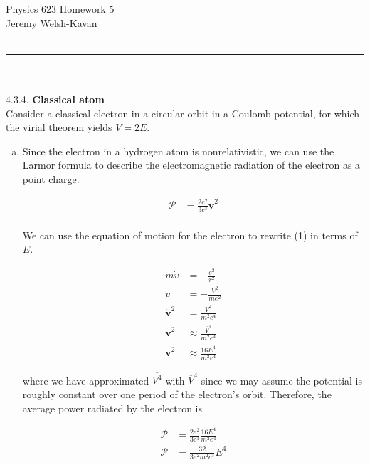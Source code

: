 \documentclass[]{article}
\begin{document}
{\Large Physics 623 Homework 5}\\
{Jeremy Welsh-Kavan}\\
\hfill \\
\noindent\rule{15cm}{0.4pt} \\
\hfill \\

4.3.4. {\bf Classical atom} \\

Consider a classical electron in a circular orbit in a Coulomb potential, for which the virial theorem yields $\overline{V} = 2E$. \\

\begin{enumerate}[a)]

\item Since the electron in a hydrogen atom is nonrelativistic, we can use the Larmor formula to describe the electromagnetic radiation of the electron as a point charge.

\begin{equation}
\begin{split}
\mathscr{P} & = \frac{2e^2}{3c^3} \dot{\bm{v}}^2 \\
\end{split}
\end{equation}

We can use the equation of motion for the electron to rewrite (1) in terms of $E$. 

\begin{equation}
\begin{split}
m \dot{v} & = - \frac{e^2}{r^2} \\
\dot{v} & = - \frac{V^2}{m e^2} \\
\dot{\bm{v}}^2 & =  \frac{V^4}{m^2 e^4} \\
\overline{ \dot{\bm{v}}^2 } & \approx \frac{\overline{V}^4}{m^2 e^4} \\
\overline{ \dot{\bm{v}}^2 } & \approx \frac{ 16 E^4}{m^2 e^4}
\end{split}
\end{equation}

where we have approximated $\overline{V^4}$ with $\overline{V}^4$ since we may assume the potential is roughly constant over one period of the electron's orbit. Therefore, the average power radiated by the electron is

\begin{equation}
\begin{split}
\mathscr{P} & = \frac{2e^2}{3c^3}\frac{ 16 E^4}{m^2 e^4} \\
\mathscr{P} & = \frac{32}{3e^2m^2c^3}  E^4 \\
\end{split}
\end{equation}



\end{enumerate}
\end{document}
